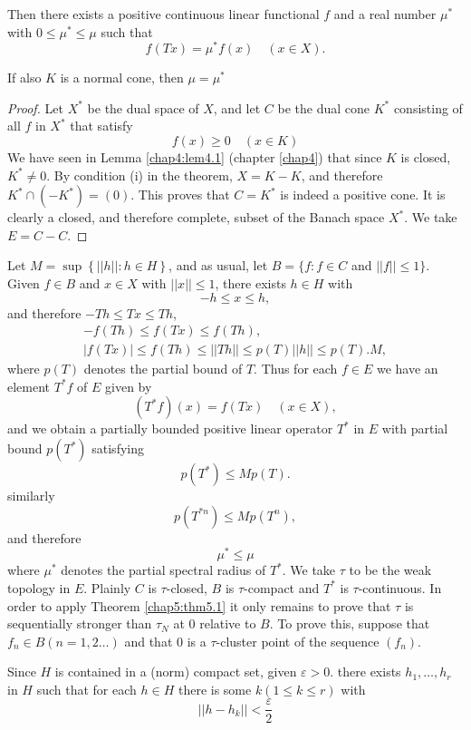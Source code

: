 Then there exists a positive continuous linear functional $f$ and a
real number $\mu^*$ with $0 \le \mu^* \le \mu$ such that 
$$
f (Tx) = \mu^* f (x) \quad (x \in X).
$$

If also $K$ is a normal cone, then $\mu = \mu^*$

\begin{proof}
  Let $X^*$ be the dual space of $X$, and let $C$ be the dual cone
  $K^*$ consisting of all $f$ in $X^*$ that satisfy 
  $$
  f (x) \ge 0 \quad (x \in K)
  $$\pageoriginale
  We have seen in Lemma \ref{chap4:lem4.1} (chapter \ref{chap4})
  that since $K$ is closed, 
  $K^* \neq 0$. By condition (i) in the theorem, $X =K-K$, and
  therefore $K^* \cap (-K^*) = (0)$. This proves that $C=K^*$ is
  indeed a positive cone. It is clearly a closed, and therefore
  complete, subset of the Banach space $X^*$. We take $E =C-C$. 
\end{proof}

Let $M=\sup \left\{ ||h|| : h \in H\right\}$, and as usual,
let $B= \{ f : f \in C $ and $ ||f|| \le 1\}$.  Given $f
\in B$ and $x \in X$ with $||x|| \le 1$, there exists
$h \in H$ with  
$$
-h \le x \le h,
$$
and therefore $-Th \le Tx \le Th$,
\begin{gather*}
  - f (Th) \le f (Tx) \le f (Th),\\
  |f (Tx)| \le f (Th) \le ||Th|| \le  p(T) ||h|| \le p (T). M,
\end{gather*}
where $p(T)$ denotes the partial bound of $T$. Thus for each $f
\in E$ we have an element $T^* f$ of $E$ given by 
$$
(T^* f) (x) = f (Tx) \quad (x \in X),
$$
and we obtain a partially bounded positive linear operator $T^*$ in
$E$ with partial bound $p(T^*)$ satisfying 
$$
p (T^*) \le M p(T).
$$
similarly\pageoriginale 
$$
p(T^{* n}) \le M p(T^n),
$$
and therefore 
$$
\mu^* \le \mu
$$
where $\mu^*$ denotes the partial spectral radius of $T^*$. We take
$\tau$ to be the weak topology in $E$. Plainly $C$ is $\tau$-closed,
$B$ is $\tau$-compact and $T^*$ is $\tau$-continuous. In order to
apply Theorem \ref{chap5:thm5.1} it only remains to prove that $\tau$ is
sequentially stronger than $\tau_N$ at 0 relative to $B$. To prove
this, suppose that $f_n \in B (n=1,2\ldots)$ and that 0 is
a $\tau$-cluster point of the sequence $(f_n)$.  

Since $H$ is contained in a (norm) compact set, given $\varepsilon >
0$. there exists $h_1 ,\ldots,h_r$ in $H$ such that for each $h
\in H$ there is some $k (1 \le k \le r)$ with  
\begin{equation}
  ||h-h_k|| <\frac{\varepsilon}{2} \tag{1}\label{chap5:equa1}
\end{equation} 
 
